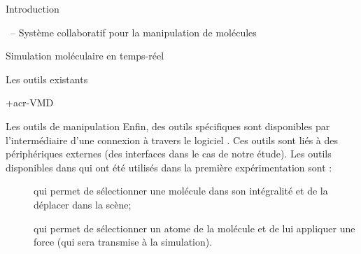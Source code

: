 \documentclass[myfrancais]{mythesis}
\begin{document}
\begin{mypart}{Introduction}
\begin{mychapter}{\myShaddock\ -- Système collaboratif pour la manipulation de molécules}
\begin{mysection}{Simulation moléculaire en temps-réel}
\begin{mysubsection}{Les outils existants}
\begin{mysubsubsection}{\myacronl+{acr-VMD}}
\begin{myparagraph}{Les outils de manipulation}
							Enfin, des outils spécifiques sont disponibles par l'intermédiaire d'une connexion à travers le logiciel  .
							Ces outils sont liés à des périphériques externes (des interfaces \myOmni dans le cas de notre étude).
							Les outils disponibles dans  qui ont été utilisés dans la première expérimentation  sont :
							\begin{description}
								\item[] qui permet de sélectionner une molécule dans son intégralité et de la déplacer dans la scène;
								\item[] qui permet de sélectionner un atome de la molécule et de lui appliquer une force (qui sera transmise à la simulation).
							\end{description}


\end{myparagraph}
\end{mysubsubsection}
\end{mysubsection}
\end{mysection}
\end{mychapter}
\end{mypart}
\end{document}
